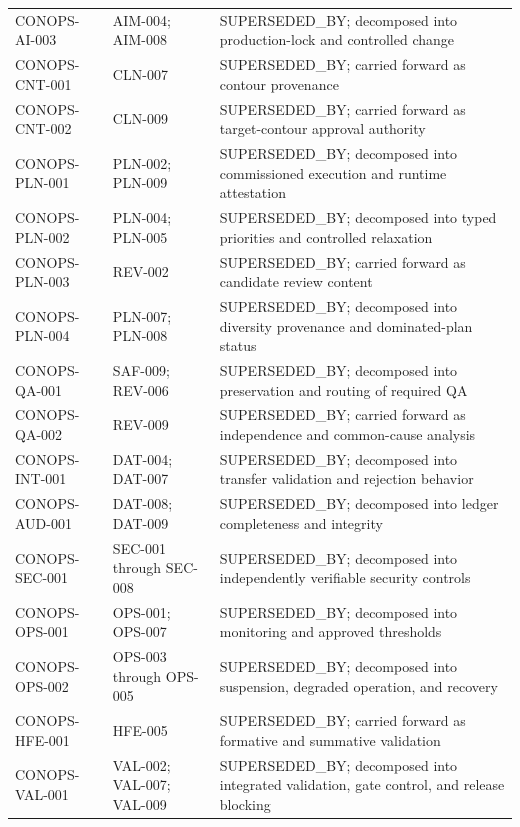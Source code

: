 \documentclass[11pt,letterpaper]{article}
\begin{document}
\begin{small}
\begin{longtable}{@{}L{0.1474\textwidth}L{0.2457\textwidth}L{0.5268\textwidth}@{}}
\addlinespace[2pt]
CONOPS-AI-003 & AIM-004; AIM-008 & SUPERSEDED\_BY; decomposed into production-lock and controlled change \\
\addlinespace[2pt]
CONOPS-CNT-001 & CLN-007 & SUPERSEDED\_BY; carried forward as contour provenance \\
\addlinespace[2pt]
CONOPS-CNT-002 & CLN-009 & SUPERSEDED\_BY; carried forward as target-contour approval authority \\
\addlinespace[2pt]
CONOPS-PLN-001 & PLN-002; PLN-009 & SUPERSEDED\_BY; decomposed into commissioned execution and runtime attestation \\
\addlinespace[2pt]
CONOPS-PLN-002 & PLN-004; PLN-005 & SUPERSEDED\_BY; decomposed into typed priorities and controlled relaxation \\
\addlinespace[2pt]
CONOPS-PLN-003 & REV-002 & SUPERSEDED\_BY; carried forward as candidate review content \\
\addlinespace[2pt]
CONOPS-PLN-004 & PLN-007; PLN-008 & SUPERSEDED\_BY; decomposed into diversity provenance and dominated-plan status \\
\addlinespace[2pt]
CONOPS-QA-001 & SAF-009; REV-006 & SUPERSEDED\_BY; decomposed into preservation and routing of required QA \\
\addlinespace[2pt]
CONOPS-QA-002 & REV-009 & SUPERSEDED\_BY; carried forward as independence and common-cause analysis \\
\addlinespace[2pt]
CONOPS-INT-001 & DAT-004; DAT-007 & SUPERSEDED\_BY; decomposed into transfer validation and rejection behavior \\
\addlinespace[2pt]
CONOPS-AUD-001 & DAT-008; DAT-009 & SUPERSEDED\_BY; decomposed into ledger completeness and integrity \\
\addlinespace[2pt]
CONOPS-SEC-001 & SEC-001 through SEC-008 & SUPERSEDED\_BY; decomposed into independently verifiable security controls \\
\addlinespace[2pt]
CONOPS-OPS-001 & OPS-001; OPS-007 & SUPERSEDED\_BY; decomposed into monitoring and approved thresholds \\
\addlinespace[2pt]
CONOPS-OPS-002 & OPS-003 through OPS-005 & SUPERSEDED\_BY; decomposed into suspension, degraded operation, and recovery \\
\addlinespace[2pt]
CONOPS-HFE-001 & HFE-005 & SUPERSEDED\_BY; carried forward as formative and summative validation \\
\addlinespace[2pt]
CONOPS-VAL-001 & VAL-002; VAL-007; VAL-009 & SUPERSEDED\_BY; decomposed into integrated validation, gate control, and release blocking \\
\end{longtable}
\end{small}
\end{document}
